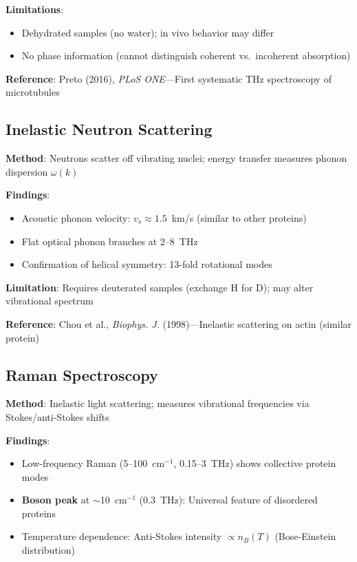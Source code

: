 \textbf{Limitations}:
\begin{itemize}
\item Dehydrated samples (no water); in vivo behavior may differ
\item No phase information (cannot distinguish coherent vs.~incoherent absorption)
\end{itemize}

\textbf{Reference}: Preto (2016), \emph{PLoS ONE}---First systematic THz spectroscopy of microtubules

\subsection{Inelastic Neutron Scattering}\label{inelastic-neutron-scattering-established}

\textbf{Method}: Neutrons scatter off vibrating nuclei; energy transfer measures phonon dispersion $\omega(k)$

\textbf{Findings}:
\begin{itemize}
\item Acoustic phonon velocity: $v_s \approx 1.5$~km/s (similar to other proteins)
\item Flat optical phonon branches at 2--8~THz
\item Confirmation of helical symmetry: 13-fold rotational modes
\end{itemize}

\textbf{Limitation}: Requires deuterated samples (exchange H for D); may alter vibrational spectrum

\textbf{Reference}: Chou et al., \emph{Biophys. J.} (1998)---Inelastic scattering on actin (similar protein)

\subsection{Raman Spectroscopy}\label{raman-spectroscopy-established}

\textbf{Method}: Inelastic light scattering; measures vibrational frequencies via Stokes/anti-Stokes shifts

\textbf{Findings}:
\begin{itemize}
\item Low-frequency Raman (5--100~cm$^{-1}$, 0.15--3~THz) shows collective protein modes
\item \textbf{Boson peak} at $\sim$10~cm$^{-1}$ (0.3~THz): Universal feature of disordered proteins
\item Temperature dependence: Anti-Stokes intensity $\propto n_B(T)$ (Bose-Einstein distribution)
\end{itemize}

